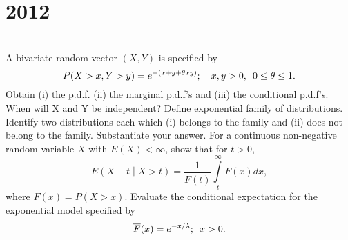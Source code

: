 \section*{2012}
\vspace{-.5cm}
\hrulefill \smallskip\\
 A bivariate random vector $(X,Y)$ is specified by 
\[ P(X>x, Y >y) = e^{-(x+y+\theta xy)}; \quad x,y >0, \enskip 0\leq\theta\leq 1.\]
Obtain (i) the p.d.f. (ii) the marginal p.d.f's and (iii) the conditional p.d.f's. When will X and Y be independent?
\myline
{} Define exponential family of distributions. Identify two distributions each which (i) belongs to the family and (ii) does not belong to the family. Substantiate your answer.
\myline
{} For a continuous non-negative random variable $X$ with $E(X) < \infty$, show that for $t >0$, \[ E\left(X-t \middle | X > t \right) = \dfrac{1}{\overline{F}(t)}\int\limits_t^\infty \overline{F}(x)dx, \] where $\overline{F}(x)=P(X>x)$. Evaluate the conditional expectation for the exponential model specified by \[\overline{F}(x)=e^{-x/\lambda}; \enskip x>0. \]